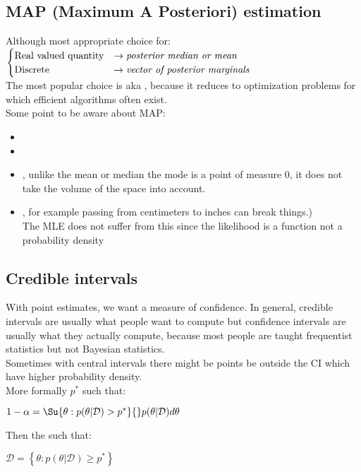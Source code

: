 \subsection{MAP (Maximum A Posteriori) estimation}
Although most appropriate choice for:\\
$
\begin{cases}
	\text{Real valued quantity} &\rightarrow \text{\emph{posterior median or mean}}\\
	\text{Discrete} &\rightarrow \text{\emph{vector of posterior marginals}}
\end{cases}
$\\
The most popular choice is  aka , because it reduces to
optimization problems for which efficient algorithms often exist.\\
Some point to be aware about MAP:
\begin{itemize}
	\item {}
	\item {}
	\item {}, unlike the mean or median the mode is a
		point of measure 0, it does not take the volume of the space into account.
	\item {}, for example 
		passing from centimeters to inches can break things.)\\ The MLE does not
		suffer from this since the likelihood is a function not a probability
		density
\end{itemize}


\subsection{Credible intervals}
With point estimates, we want a measure of confidence. 
In general, credible intervals are usually what people want to compute but confidence
intervals are usually what they actually compute, because most people are taught 
frequentist statistics but not Bayesian statistics.\\
Sometimes with central intervals there might be points be outside the CI which have higher
probability density.\\
More formally $p^{*}$ such that: 
\begin{center}
	$1-\alpha = 
	\Su{{\theta:p(\theta|\mathcal{D})>p^{*}}}{}p(\theta|\mathcal{D})d\theta$
\end{center}
Then the  such that:
\begin{center}
	$\mathcal{D}=\left\{\theta: p(\theta|\mathcal{D})\geq p^{*}\right\}$
\end{center}
